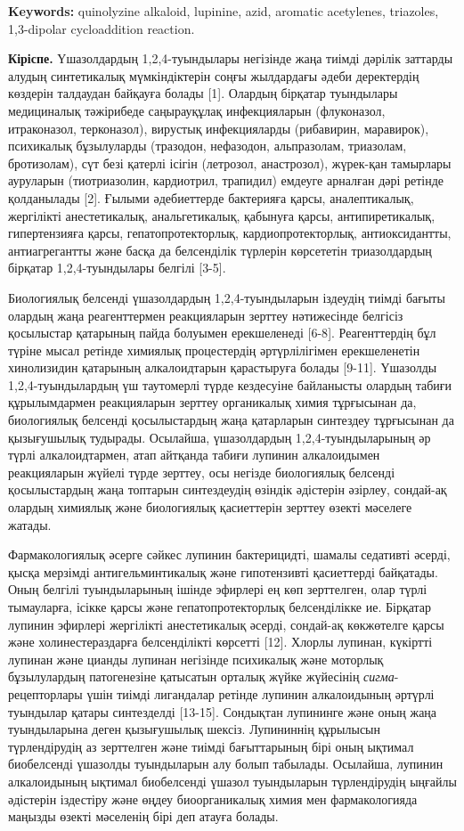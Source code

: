 {\bfseries Keywords:} quinolyzine alkaloid, lupinine, azid, aromatic
acetylenes, triazoles, 1,3-dipolar cycloaddition reaction.

\begin{multicols}{2}
{\bfseries Кіріспе.} Үшазолдардың 1,2,4-туындылары негізінде жаңа тиімді
дәрілік заттарды алудың синтетикалық мүмкіндіктерін соңғы жылдардағы
әдеби деректердің көздерін талдаудан байқауға болады {[}1{]}. Олардың
бірқатар туындылары медициналық тәжірибеде саңырауқұлақ инфекцияларын
(флуконазол, итраконазол, терконазол), вирустық инфекцияларды
(рибавирин, маравирок), психикалық бұзылуларды (тразодон, нефазодон,
альпразолам, триазолам, бротизолам), сүт безі қатерлі ісігін (летрозол,
анастрозол), жүрек-қан тамырлары ауруларын (тиотриазолин, кардиотрил,
трапидил) емдеуге арналған дәрі ретінде қолданылады {[}2{]}. Ғылыми
әдебиеттерде бактерияға қарсы, аналептикалық, жергілікті анестетикалық,
анальгетикалық, қабынуға қарсы, антипиретикалық, гипертензияға қарсы,
гепатопротекторлық, кардиопротекторлық, антиоксидантты, антиагрегантты
және басқа да белсенділік түрлерін көрсететін триазолдардың бірқатар
1,2,4-туындылары белгілі {[}3-5{]}.

Биологиялық белсенді үшазолдардың 1,2,4-туындыларын іздеудің тиімді
бағыты олардың жаңа реагенттермен реакцияларын зерттеу нәтижесінде
белгісіз қосылыстар қатарының пайда болуымен ерекшеленеді {[}6-8{]}.
Реагенттердің бұл түріне мысал ретінде химиялық процестердің
әртүрлілігімен ерекшеленетін хинолизидин қатарының алкалоидтарын
қарастыруға болады {[}9-11{]}. Үшазолды 1,2,4-туындылардың үш таутомерлі
түрде кездесуіне байланысты олардың табиғи құрылымдармен реакцияларын
зерттеу органикалық химия тұрғысынан да, биологиялық белсенді
қосылыстардың жаңа қатарларын синтездеу тұрғысынан да қызығушылық
тудырады. Осылайша, үшазолдардың 1,2,4-туындыларының әр түрлі
алкалоидтармен, атап айтқанда табиғи лупинин алкалоидымен реакцияларын
жүйелі түрде зерттеу, осы негізде биологиялық белсенді қосылыстардың
жаңа топтарын синтездеудің өзіндік әдістерін әзірлеу, сондай-ақ олардың
химиялық және биологиялық қасиеттерін зерттеу өзекті мәселеге жатады.

Фармакологиялық әсерге сәйкес лупинин бактерицидті, шамалы седативті
әсерді, қысқа мерзімді антигельминтикалық және гипотензивті қасиеттерді
байқатады. Оның белгілі туындыларының ішінде эфирлері ең көп зерттелген,
олар түрлі тымауларға, ісікке қарсы және гепатопротекторлық
белсенділікке ие. Бірқатар лупинин эфирлері жергілікті анестетикалық
әсерді, сондай-ақ көкжөтелге қарсы және холинестераздарға белсенділікті
көрсетті {[}12{]}. Хлорлы лупинан, күкіртті лупинан және цианды лупинан
негізінде психикалық және моторлық бұзылулардың патогенезіне қатысатын
орталық жүйке жүйесінің \emph{сигма}-рецепторлары үшін тиімді лигандалар
ретінде лупинин алкалоидының әртүрлі туындылар қатары синтезделді
{[}13-15{]}. Сондықтан лупининге және оның жаңа туындыларына деген
қызығушылық шексіз. Лупининнің құрылысын түрлендірудің аз зерттелген
және тиімді бағыттарының бірі оның ықтимал биобелсенді үшазолды
туындыларын алу болып табылады. Осылайша, лупинин алкалоидының ықтимал
биобелсенді үшазол туындыларын түрлендірудің ыңғайлы әдістерін іздестіру
және өңдеу биоорганикалық химия мен фармакологияда маңызды өзекті
мәселенің бірі деп атауға болады.


\end{multicols}

